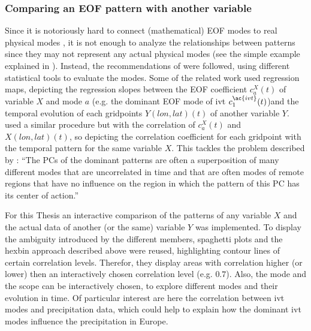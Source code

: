 \subsubsection{Comparing an EOF pattern with another variable}

Since it is notoriously hard to connect (mathematical) EOF modes to real physical modes \cite{hannachi_empirical_2007, dommenget_cautionary_2002}, it is not enough to analyze the relationships between patterns since they may not represent any actual physical modes (see the simple example explained in ). 
Instead, the recommendations of  were followed, using different statistical tools to evaluate the modes. 
Some of the related work \cite{zou_interdecadal_2018, zhou_atmospheric_2005, li_quasi-4-yr_2012} used regression maps, depicting the regression slopes between the EOF coefficient $c_a^X(t)$ of variable $X$ and mode $a$ (e.g. the dominant EOF mode of \ac{ivt} $c_1^{\ac{ivt}}(t)$)and the temporal evolution of each gridpoints $Y(lon, lat)(t)$ of another variable $Y$. 
 used a similar procedure but with the correlation of $c_a^X(t)$ and $X(lon, lat)(t)$, so depicting the correlation coefficient for each gridpoint with the temporal pattern for the same variable $X$. 
This tackles the problem described by \citeauthor{dommenget_cautionary_2002}: \enquote{The PCs of the dominant patterns are often a superposition of many different modes that are uncorrelated in time and that are often modes of remote regions that have no influence on the region in which the pattern of this PC has its center of action.} \cite{dommenget_cautionary_2002} 


For this Thesis an interactive comparison of the patterns of any variable $X$ and the actual data of another (or the same) variable $Y$ was implemented.
To display the ambiguity introduced by the different members, spaghetti plots and the hexbin approach described above were reused, highlighting contour lines of certain correlation levels. 
Therefor, they display areas with correlation higher (or lower) then an interactively chosen correlation level (e.g. $0.7$). 
Also, the mode and the scope can be interactively chosen, to explore different modes and their evolution in time. 
Of particular interest are here the correlation between \ac{ivt} modes and precipitation data, which could help to explain how the dominant \ac{ivt} modes influence the precipitation in Europe. 

